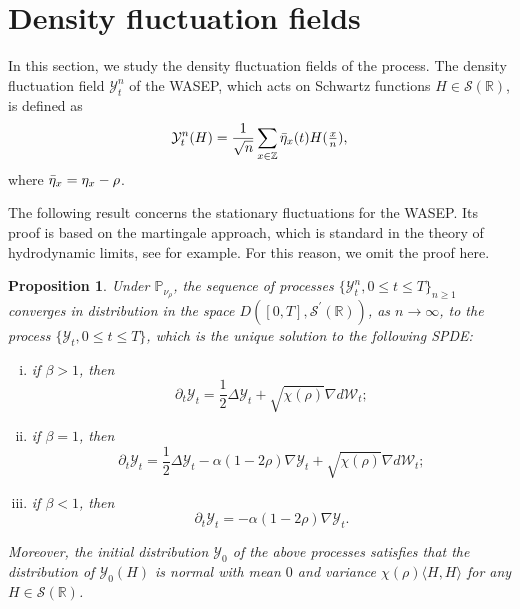 \documentclass[reqno,11pt]{amsart}
\numberwithin{equation}{section}
\newtheorem{proposition}[theorem]{Proposition}
\newcommand{\Pbb}{\mathbb{P}}
\newcommand{\R}{\mathbb{R}}
\newcommand{\Z}{\mathbb{Z}}
\newcommand{\Scal}{\mathcal{S}}
\newcommand{\Ycal}{\mathcal{Y}}
\begin{document}
%
%



\section{Density fluctuation fields}\label{sec: density flieds}

In this section, we study the density fluctuation fields of the process. The  density fluctuation field $\Ycal^n_t$ of the WASEP, which acts on Schwartz functions $H \in \Scal (\R)$, is defined  as
\[\Ycal^n_t (H) = \frac{1}{\sqrt{n}} \sum_{x \in \Z} \Bar{\eta}_x (t)H(\tfrac{x}{n}),\]
where $\Bar{\eta}_x = \eta_x - \rho$.

The following result concerns the stationary fluctuations for the WASEP.  Its proof is based on the  martingale approach, which is standard in the theory of hydrodynamic limits, see \cite[Chapter 11]{klscaling}  for example.  For this reason, we omit the proof here.

\begin{proposition}\label{prop clt filed}
	Under $\Pbb_{\nu_\rho}$, the sequence of processes $\{\Ycal^n_t, 0 \leq t \leq T\}_{n \geq 1}$ converges in distribution in the space $D([0,T], \Scal^\prime (\R))$, as $n \rightarrow \infty$, to the process $\{\Ycal_t, 0 \leq t \leq T\}$, which is the unique solution to the following SPDE:
	\begin{enumerate}[(i)]
		\item if $\beta > 1$, then
		\[\partial_t \Ycal_t = \frac{1}{2} \Delta \Ycal_t + \sqrt{\chi (\rho)} \nabla d \mathcal{W}_t;\]
		\item if $\beta = 1$, then
		\[\partial_t \Ycal_t = \frac{1}{2} \Delta \Ycal_t - \alpha(1-2\rho) \nabla \Ycal_t+ \sqrt{\chi (\rho)} \nabla d \mathcal{W}_t;\]
		\item if $\beta < 1$, then
		\[\partial_t \Ycal_t  = - \alpha(1-2\rho) \nabla \Ycal_t.\]
	\end{enumerate}
	Moreover, the  initial distribution $\mathcal{Y}_0$ of the above processes satisfies that  the distribution of $\mathcal{Y}_0 (H)$ is normal  with mean $0$ and variance $\chi(\rho)\langle H, H\rangle$ for any $H\in \Scal(\R)$. 
\end{proposition}
\end{document}
